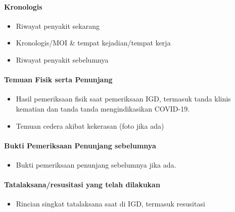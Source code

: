 \documentclass[
]{book}
\providecommand{\tightlist}{%
  \setlength{\itemsep}{0pt}\setlength{\parskip}{0pt}}
\begin{document}
\hypertarget{kronologis-1}{%
\paragraph{Kronologis}\label{kronologis-1}}

\begin{itemize}
\item
  Riwayat penyakit sekarang
\item
  Kronologis/MOI \& tempat kejadian/tempat kerja
\item
  Riwayat penyakit sebelumnya
\end{itemize}

\hypertarget{temuan-fisik-serta-penunjang-1}{%
\paragraph{Temuan Fisik serta Penunjang}\label{temuan-fisik-serta-penunjang-1}}

\begin{itemize}
\item
  Hasil pemeriksaan fisik saat pemeriksaan IGD, termasuk tanda klinis kematian dan tanda tanda mengindikasikan COVID-19.
\item
  Temuan cedera akibat kekerasan (foto jika ada)
\end{itemize}

\hypertarget{bukti-pemeriksaan-penunjang-sebelumnya-2}{%
\paragraph{Bukti Pemeriksaan Penunjang sebelumnya}\label{bukti-pemeriksaan-penunjang-sebelumnya-2}}

\begin{itemize}
\tightlist
\item
  Bukti pemeriksaan penunjang sebelumnya jika ada.
\end{itemize}

\hypertarget{tatalaksanaresusitasi-yang-telah-dilakukan-2}{%
\paragraph{Tatalaksana/resusitasi yang telah dilakukan}\label{tatalaksanaresusitasi-yang-telah-dilakukan-2}}

\begin{itemize}
\tightlist
\item
  Rincian singkat tatalaksana saat di IGD, termasuk resusitasi
\end{itemize}
\end{document}
